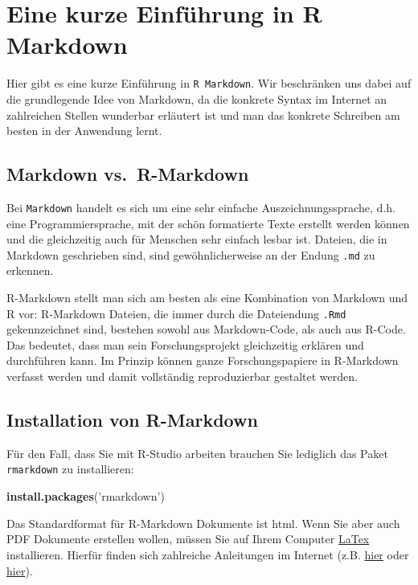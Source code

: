 \documentclass[]{book}
\newenvironment{Shaded}{\begin{snugshade}}{\end{snugshade}}
\newcommand{\KeywordTok}[1]{\textcolor[rgb]{0.13,0.29,0.53}{\textbf{#1}}}
\newcommand{\StringTok}[1]{\textcolor[rgb]{0.31,0.60,0.02}{#1}}
\newcommand{\NormalTok}[1]{#1}
\begin{document}
\appendix


\chapter{Eine kurze Einführung in R Markdown}\label{markdown}

Hier gibt es eine kurze Einführung in \texttt{R\ Markdown}. Wir
beschränken uns dabei auf die grundlegende Idee von Markdown, da die
konkrete Syntax im Internet an zahlreichen Stellen wunderbar erläutert
ist und man das konkrete Schreiben am besten in der Anwendung lernt.

\section{Markdown vs.~R-Markdown}\label{markdown-vs.r-markdown}

Bei \texttt{Markdown} handelt es sich um eine sehr einfache
Auszeichnungssprache, d.h. eine Programmiersprache, mit der schön
formatierte Texte erstellt werden können und die gleichzeitig auch für
Menschen sehr einfach lesbar ist. Dateien, die in Markdown geschrieben
sind, sind gewöhnlicherweise an der Endung \texttt{.md} zu erkennen.

R-Markdown stellt man sich am besten als eine Kombination von Markdown
und R vor: R-Markdown Dateien, die immer durch die Dateiendung
\texttt{.Rmd} gekennzeichnet sind, bestehen sowohl aus Markdown-Code,
als auch aus R-Code. Das bedeutet, dass man sein Forschungsprojekt
gleichzeitig erklären und durchführen kann. Im Prinzip können ganze
Forschungspapiere in R-Markdown verfasst werden und damit vollständig
reproduzierbar gestaltet werden.

\section{Installation von R-Markdown}\label{installation-von-r-markdown}

Für den Fall, dass Sie mit R-Studio arbeiten brauchen Sie lediglich das
Paket \texttt{rmarkdown} zu installieren:

\begin{Shaded}
\begin{Highlighting}[]
\KeywordTok{install.packages}\NormalTok{(}\StringTok{'rmarkdown'}\NormalTok{)}
\end{Highlighting}
\end{Shaded}

Das Standardformat für R-Markdown Dokumente ist html. Wenn Sie aber auch
PDF Dokumente erstellen wollen, müssen Sie auf Ihrem Computer
\href{https://www.latex-project.org/}{LaTex} installieren. Hierfür
finden sich zahlreiche Anleitungen im Internet (z.B.
\href{https://www.latex-tutorial.com/installation/}{hier} oder
\href{https://www.latex-project.org/get/}{hier}).
\end{document}
